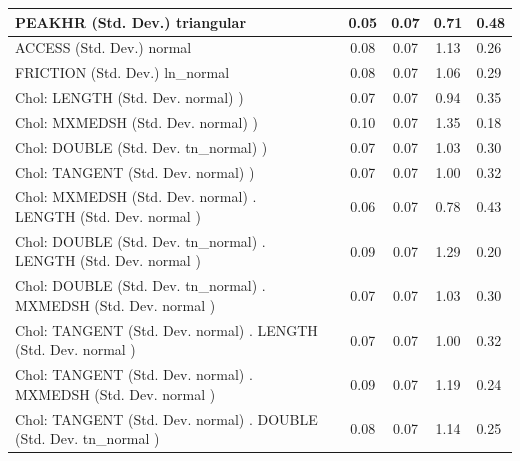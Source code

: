\begin{table}
\begin{center}
\begin{tabular}{|l|l|c|c|c|l|}
			PEAKHR (Std. Dev.) triangular &  & 0.05 & 0.07 & 0.71 & 0.48 \\
			\hline
			ACCESS (Std. Dev.) normal &  & 0.08 & 0.07 & 1.13 & 0.26 \\
			\hline
			FRICTION (Std. Dev.) ln_normal &  & 0.08 & 0.07 & 1.06 & 0.29 \\
			\hline
			 Chol: LENGTH (Std. Dev. normal) ) &  & 0.07 & 0.07 & 0.94 & 0.35 \\
			\hline
			 Chol: MXMEDSH (Std. Dev. normal) ) &  & 0.10 & 0.07 & 1.35 & 0.18 \\
			\hline
			 Chol: DOUBLE (Std. Dev. tn_normal) ) &  & 0.07 & 0.07 & 1.03 & 0.30 \\
			\hline
			 Chol: TANGENT (Std. Dev. normal) ) &  & 0.07 & 0.07 & 1.00 & 0.32 \\
			\hline
			 Chol: MXMEDSH (Std. Dev. normal) . LENGTH (Std. Dev.   normal ) &  & 0.06 & 0.07 & 0.78 & 0.43 \\
			\hline
			 Chol: DOUBLE (Std. Dev. tn_normal) . LENGTH (Std. Dev.   normal ) &  & 0.09 & 0.07 & 1.29 & 0.20 \\
			\hline
			 Chol: DOUBLE (Std. Dev. tn_normal) . MXMEDSH (Std. Dev.   normal ) &  & 0.07 & 0.07 & 1.03 & 0.30 \\
			\hline
			 Chol: TANGENT (Std. Dev. normal) . LENGTH (Std. Dev.   normal ) &  & 0.07 & 0.07 & 1.00 & 0.32 \\
			\hline
			 Chol: TANGENT (Std. Dev. normal) . MXMEDSH (Std. Dev.   normal ) &  & 0.09 & 0.07 & 1.19 & 0.24 \\
			\hline
			 Chol: TANGENT (Std. Dev. normal) . DOUBLE (Std. Dev.   tn_normal ) &  & 0.08 & 0.07 & 1.14 & 0.25 \\
			\hline
		\end{tabular}
	\end{center}
\end{table}